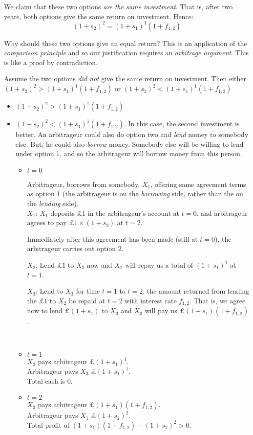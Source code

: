 We claim that these two options \textit{are the same investment}. That is, 
after two years, both options give the same return on investment. Hence:
$$(1+s_2)^2 = (1 +s_1)^{1}(1 + f_{1,2})$$

Why should these two options give an equal return? This is an application 
of the \textit{comparison principle} and so our justification requires 
an \textit{arbitrage argument}. This is like a proof by contradiction.

Assume the two options \textit{did not} give the same return on investment. 
Then either $(1+s_2)^2 > (1 +s_1)^{1}(1 + f_{1,2})$ or $(1+s_2)^2 < (1 +s_1)^{1}(1 + f_{1,2})$
\begin{itemize}
\item $(1+s_2)^2 > (1 +s_1)^{1}(1 + f_{1,2})$
\item $(1+s_2)^2 < (1 +s_1)^{1}(1 + f_{1,2})$. In this case, the second investment 
is better. An arbitrageur could also do option two and \textit{lend} money to somebody else. 
But, he could also \textit{borrow} money. Somebody else will be willing to lend under option 1, 
and so the arbitrageur will borrow money from this person. \\
\begin{itemize}
\item $t = 0$ 

Arbitrageur, borrows from somebody, $X_1$, offering same agreement terms as option 1 
(the arbitrageur is on the \textit{borrowing} side, rather than the on the \textit{lending} side).\\ 
$X_1$: $X_1$ deposits $\pounds 1$ in the arbitrageur's account at $t = 0$. 
and arbitrageur agrees to pay $\pounds 1 \times (1 + s_2)$ at $t = 2$.

\frmrule 

Immediately after this agreement has been made (still at $t = 0$), the arbitrageur carries out option 2. 

$X_2$: Lend $\pounds 1$ to $X_2$ now and $X_2$ will repay us a total of $(1 + s_1)^1$ at $t = 1$. 

$X_3$: Lend to $X_3$ for time $t = 1$ to $t = 2$, the amount returned from lending the $\pounds 1$
to $X_2$ be repaid at $t = 2$ with interest rate $f_{1,2}$.  That is, we agree now to lend $\pounds (1 + s_1)$
to $X_3$ and $X_3$ will pay us $\pounds (1 + s_1)(1 + f_{1,2})$. 

\frmrule \\
\item $t = 1$ \\
$X_2$ pays arbitrageur $\pounds (1+s_1)^1$. \\
Arbitrageur pays $X_3$ $\pounds (1+s_1)^1$. \\
Total cash is $0$. \\
\frmrule 
\item 
$t = 2$ \\
$X_3$ pays arbitrageur $\pounds (1 + s_1)(1 + f_{1,2})$. \\
Arbitrageur pays $X_1$ $\pounds (1+s_2)^2$. \\
Total profit of $(1 + s_1)(1 + f_{1,2}) - (1+s_2)^2 > 0$. 
\end{itemize}
\end{itemize}

